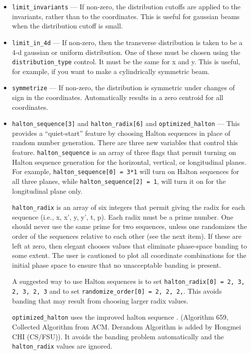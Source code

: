 \documentclass[11pt]{article}
\begin{document}
\begin{itemize}
\item \verb|limit_invariants| --- If non-zero, the distribution
cutoffs are applied to the invariants, rather than to the coordinates.
This is useful for gaussian beams when the distribution cutoff is
small.

\item \verb|limit_in_4d| --- If non-zero, then the transverse
distribution is taken to be a 4-d gaussian or uniform distribution.
One of these must be chosen using the \verb|distribution_type|
control.  It must be the same for x and y.  This is useful, for
example, if you want to make a cylindrically symmetric beam.

\item \verb|symmetrize| --- If non-zero, the distribution is symmetric
under changes of sign in the coordinates.  Automatically results in a
zero centroid for all coordinates.

\item \verb|halton_sequence[3]| and \verb|halton_radix[6]| and \verb|optimized_halton|
--- This provides a ``quiet-start'' feature by choosing Halton sequences in
place of random number generation.  There are three new variables that
control this feature.  \verb|halton_sequence| is an array of three
flags that permit turning on Halton sequence generation for the
horizontal, vertical, or longitudinal planes.  For example,
\verb|halton_sequence[0] = 3*1| will turn on Halton sequences for all
three planes, while \verb|halton_sequence[2] = 1|, will turn it on for
the longitudinal plane only.

\verb|halton_radix| is an array of six integers that permit giving the
radix for each sequence (i.e., x, x', y, y', t, p).  Each radix must
be a prime number.  One should never use the same prime for two
sequences, unless one randomizes the order of the sequences relative to
each other (see the next item).  If these are left at zero, then
elegant chooses values that eliminate phase-space banding to some
extent.  The user is cautioned to plot all coordinate combinations for
the initial phase space to ensure that no unacceptable banding is
present.

A suggested way to use Halton sequences is to set
\verb|halton_radix[0] = 2, 3, 2, 3, 2, 3| and
to set 
\verb|randomize_order[0] = 2, 2, 2,|.  This avoids banding that may
result from choosing larger radix values.

\verb|optimized_halton| uses the improved halton sequence \cite{Chi2005}.
(Algorithm 659, Collected Algorithm from ACM. Derandom Algorithm is added
by Hongmei CHI (CS/FSU)). It avoids the banding problem automatically and
the \verb|halton_radix| values are ignored.


\end{itemize}
\end{document}
